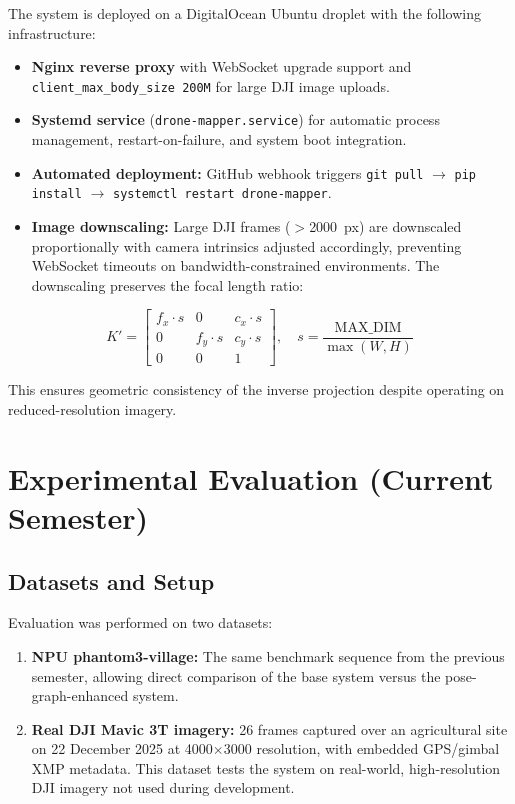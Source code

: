 \documentclass[conference]{IEEEtran}
\begin{document}
The system is deployed on a DigitalOcean Ubuntu droplet with the following infrastructure:

\begin{itemize}
    \item \textbf{Nginx reverse proxy} with WebSocket upgrade support and \texttt{client\_max\_body\_size 200M} for large DJI image uploads.
    \item \textbf{Systemd service} (\texttt{drone-mapper.service}) for automatic process management, restart-on-failure, and system boot integration.
    \item \textbf{Automated deployment:} GitHub webhook triggers \texttt{git pull} $\rightarrow$ \texttt{pip install} $\rightarrow$ \texttt{systemctl restart drone-mapper}.
    \item \textbf{Image downscaling:} Large DJI frames ($>$2000~px) are downscaled proportionally with camera intrinsics adjusted accordingly, preventing WebSocket timeouts on bandwidth-constrained environments. The downscaling preserves the focal length ratio:
\end{itemize}

\begin{equation}
K' = \begin{bmatrix}
f_x \cdot s & 0 & c_x \cdot s \\
0 & f_y \cdot s & c_y \cdot s \\
0 & 0 & 1
\end{bmatrix}, \quad s = \frac{\text{MAX\_DIM}}{\max(W, H)}
\end{equation}

This ensures geometric consistency of the inverse projection despite operating on reduced-resolution imagery.


\section{Experimental Evaluation (Current Semester)}
\label{sec:results_curr}

\subsection{Datasets and Setup}

Evaluation was performed on two datasets:
\begin{enumerate}
    \item \textbf{NPU phantom3-village:} The same benchmark sequence from the previous semester, allowing direct comparison of the base system versus the pose-graph-enhanced system.
    \item \textbf{Real DJI Mavic 3T imagery:} 26 frames captured over an agricultural site on 22 December 2025 at 4000$\times$3000 resolution, with embedded GPS/gimbal XMP metadata. This dataset tests the system on real-world, high-resolution DJI imagery not used during development.
\end{enumerate}
\end{document}
